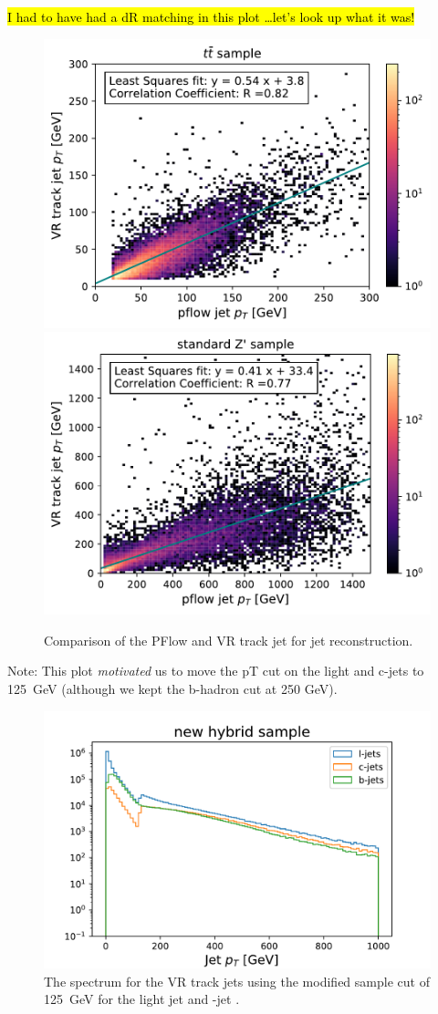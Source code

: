 \hl{I had to have had a dR matching in this plot \ldots let's look up what it was!}

\begin{figure}[htbp]
  \centering
  \includegraphics[width=.45\textwidth]{figures/ftag/VR trainings/pt-VR-pflow-ttvar}
  \includegraphics[width=.45\textwidth]{figures/ftag/VR trainings/pt-VR-pflow-std-Zprime}
  \caption{Comparison of the PFlow and VR track jet \pt for jet reconstruction.}
  \label{fig:pt-VR-pflow}
\end{figure}

Note: This plot \emph{motivated} us to move the pT cut on the light and c-jets to 125~GeV (although we kept the b-hadron \pt cut at 250 GeV).

\begin{figure}[htbp]
  \centering
  \includegraphics[width=.6\textwidth]{figures/ftag/VR trainings/pt-hyb-vr}
  \caption{The \pt spectrum for the VR track jets using the modified sample cut of 125~GeV for the light jet and \Pqb-jet \pt.}
  \label{fig:pflow-pt-extended-hybrid}
\end{figure}



